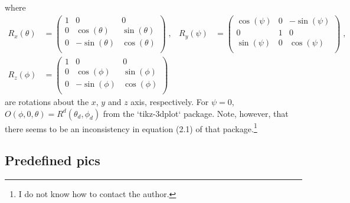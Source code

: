\documentclass[a4paper]{ltxdoc}
\begin{document}
where 
\begin{align*}
 R_x(\theta)&=
 \begin{pmatrix}
  1 & 0 & 0 \\
  0 & \cos (\theta ) & \sin (\theta ) \\
  0 & -\sin (\theta ) & \cos (\theta ) \\
 \end{pmatrix}\;,&
 R_y(\psi)&=
 \begin{pmatrix}
  \cos (\psi ) & 0 & -\sin (\psi ) \\
  0 & 1 & 0 \\
  \sin (\psi ) & 0 & \cos (\psi ) \\
 \end{pmatrix}\;,\\
 R_z(\phi)&=
 \begin{pmatrix}
  1 & 0 & 0 \\
  0 & \cos (\phi ) & \sin (\phi ) \\
  0 & -\sin (\phi ) & \cos (\phi ) \\
 \end{pmatrix}
\end{align*}
are rotations about the $x$, $y$ and $z$ axis, respectively. 
For $\psi=0$, $O(\phi,0,\theta)=R^d(\theta_d,\phi_d)$ from the `tikz-3dplot`
package. Note, however, that there seems to be an inconsistency in equation
(2.1) of that package.\footnote{I do not know how to contact the author.}

\begin{codeexample}[width=2.5cm]
\end{codeexample}

\subsection{Predefined pics}
\end{document}
